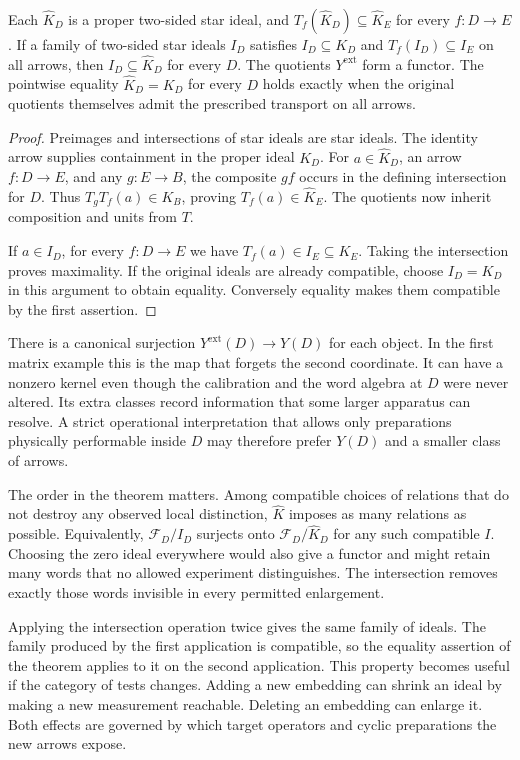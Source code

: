 \documentclass[11pt,letterpaper]{article}
\newcommand{\F}{\mathcal F}
\newcommand{\sat}{\widehat K}
\begin{document}
\begin{theorem}\label{thm:largest}
Each $\sat_D$ is a proper two-sided star ideal, and $T_f(\sat_D)\subseteq\sat_E$ for every $f:D\to E$. If a family of two-sided star ideals $I_D$ satisfies $I_D\subseteq K_D$ and $T_f(I_D)\subseteq I_E$ on all arrows, then $I_D\subseteq\sat_D$ for every $D$. The quotients $Y^{\mathrm{ext}}$ form a functor. The pointwise equality $\sat_D=K_D$ for every $D$ holds exactly when the original quotients themselves admit the prescribed transport on all arrows.
\end{theorem}
\begin{proof}
Preimages and intersections of star ideals are star ideals. The identity arrow supplies containment in the proper ideal $K_D$. For $a\in\sat_D$, an arrow $f:D\to E$, and any $g:E\to B$, the composite $gf$ occurs in the defining intersection for $D$. Thus $T_gT_f(a)\in K_B$, proving $T_f(a)\in\sat_E$. The quotients now inherit composition and units from $T$.

If $a\in I_D$, for every $f:D\to E$ we have $T_f(a)\in I_E\subseteq K_E$. Taking the intersection proves maximality. If the original ideals are already compatible, choose $I_D=K_D$ in this argument to obtain equality. Conversely equality makes them compatible by the first assertion.
\end{proof}

There is a canonical surjection $Y^{\mathrm{ext}}(D)\to Y(D)$ for each object. In the first matrix example this is the map that forgets the second coordinate. It can have a nonzero kernel even though the calibration and the word algebra at $D$ were never altered. Its extra classes record information that some larger apparatus can resolve. A strict operational interpretation that allows only preparations physically performable inside $D$ may therefore prefer $Y(D)$ and a smaller class of arrows.

The order in the theorem matters. Among compatible choices of relations that do not destroy any observed local distinction, $\sat$ imposes as many relations as possible. Equivalently, $\F_D/I_D$ surjects onto $\F_D/\sat_D$ for any such compatible $I$. Choosing the zero ideal everywhere would also give a functor and might retain many words that no allowed experiment distinguishes. The intersection removes exactly those words invisible in every permitted enlargement.

Applying the intersection operation twice gives the same family of ideals. The family produced by the first application is compatible, so the equality assertion of the theorem applies to it on the second application. This property becomes useful if the category of tests changes. Adding a new embedding can shrink an ideal by making a new measurement reachable. Deleting an embedding can enlarge it. Both effects are governed by which target operators and cyclic preparations the new arrows expose.
\end{document}
